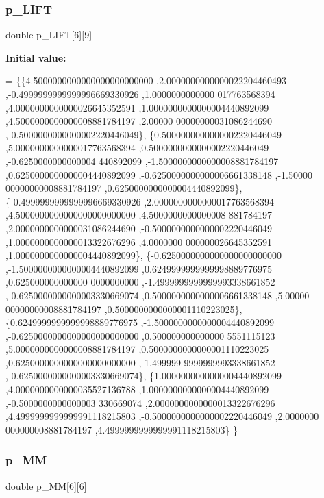 \subsubsection{\texorpdfstring{p\+\_\+\+L\+I\+FT}{p\_LIFT}}
{\footnotesize\ttfamily double p\+\_\+\+L\+I\+FT\mbox{[}6\mbox{]}\mbox{[}9\mbox{]}}

{\bfseries Initial value\+:}
\begin{DoxyCode}
= \{\{4.5000000000000000000000000 ,2.0000000000000022204460493 ,-0.4999999999999996669330926 ,1.0000000000000
      017763568394 ,4.0000000000000026645352591 ,1.0000000000000004440892099 ,4.5000000000000008881784197 ,2.00000
      00000000031086244690 ,-0.5000000000000002220446049\},
\{0.5000000000000002220446049 ,5.0000000000000017763568394 ,0.5000000000000002220446049 ,-0.6250000000000004
      440892099 ,-1.5000000000000008881784197 ,0.6250000000000004440892099 ,-0.6250000000000006661338148 ,-1.50000
      00000000008881784197 ,0.6250000000000004440892099\},
\{-0.4999999999999996669330926 ,2.0000000000000017763568394 ,4.5000000000000000000000000 ,4.5000000000000008
      881784197 ,2.0000000000000031086244690 ,-0.5000000000000002220446049 ,1.0000000000000013322676296 ,4.0000000
      000000026645352591 ,1.0000000000000004440892099\},
\{-0.6250000000000000000000000 ,-1.5000000000000004440892099 ,0.6249999999999998889776975 ,0.625000000000000
      0000000000 ,-1.4999999999999993338661852 ,-0.6250000000000003330669074 ,0.5000000000000006661338148 ,5.00000
      00000000008881784197 ,0.5000000000000001110223025\},
\{0.6249999999999998889776975 ,-1.5000000000000004440892099 ,-0.6250000000000000000000000 ,0.500000000000000
      5551115123 ,5.0000000000000008881784197 ,0.5000000000000001110223025 ,0.6250000000000000000000000 ,-1.499999
      9999999993338661852 ,-0.6250000000000003330669074\},
\{1.0000000000000004440892099 ,4.0000000000000035527136788 ,1.0000000000000004440892099 ,-0.5000000000000003
      330669074 ,2.0000000000000013322676296 ,4.4999999999999991118215803 ,-0.5000000000000002220446049 ,2.0000000
      000000008881784197 ,4.4999999999999991118215803\}
\}
\end{DoxyCode}
\mbox{\label{a00449_a2a5e7e98c7e6e147342b0fa97b2f1f5a}} 
\subsubsection{\texorpdfstring{p\+\_\+\+MM}{p\_MM}}
{\footnotesize\ttfamily double p\+\_\+\+MM\mbox{[}6\mbox{]}\mbox{[}6\mbox{]}}

